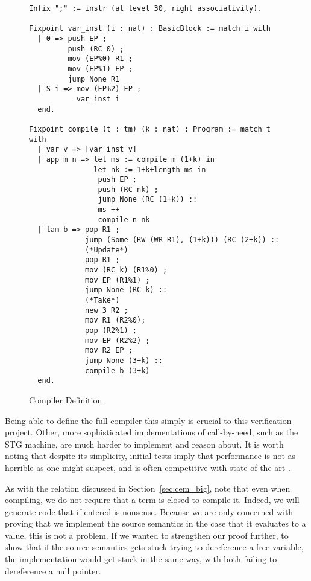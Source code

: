 \begin{figure}
\begin{lstlisting}
Infix ";" := instr (at level 30, right associativity).

Fixpoint var_inst (i : nat) : BasicBlock := match i with
  | 0 => push EP ;
         push (RC 0) ;
         mov (EP%0) R1 ;
         mov (EP%1) EP ;
         jump None R1
  | S i => mov (EP%2) EP ;
           var_inst i
  end.

Fixpoint compile (t : tm) (k : nat) : Program := match t with
  | var v => [var_inst v]
  | app m n => let ms := compile m (1+k) in
               let nk := 1+k+length ms in
                push EP ;
                push (RC nk) ;
                jump None (RC (1+k)) ::
                ms ++
                compile n nk
  | lam b => pop R1 ;
             jump (Some (RW (WR R1), (1+k))) (RC (2+k)) ::
             (*Update*)
             pop R1 ;
             mov (RC k) (R1%0) ;
             mov EP (R1%1) ;
             jump None (RC k) ::
             (*Take*)
             new 3 R2 ;
             mov R1 (R2%0);
             pop (R2%1) ;
             mov EP (R2%2) ;
             mov R2 EP ;
             jump None (3+k) ::
             compile b (3+k)
  end. 
\end{lstlisting}
\caption{Compiler Definition}
\label{fig:compiler}
\end{figure}

Being able to define the full compiler this simply is crucial to this
verification project. Other, more sophisticated implementations of call-by-need,
such as the STG machine, are much harder to implement and reason about. It is
worth noting that despite its simplicity, initial tests imply that performance
is not as horrible as one might suspect, and is often competitive with state of
the art \cite{cem}.

As with the relation discussed in Section~\ref{sec:cem_big}, note that even when
compiling, we do not require that a term is closed to compile it. Indeed, we
will generate code that if entered is nonsense. Because we are only concerned
with proving that we implement the source semantics in the case that it
evaluates to a value, this is not a problem. If we wanted to strengthen our
proof further, to show that if the source semantics gets stuck trying to
dereference a free variable, the implementation would get stuck in the same way,
with both failing to dereference a null pointer.    
